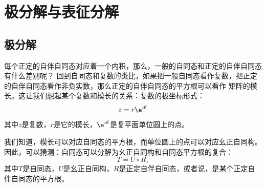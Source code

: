 \documentclass[12pt,UTF8,fontset=none]{ctexbook}
\begin{document}

\section{极分解与表征分解}

\subsection{极分解}
每个正定的自伴自同态对应着一个内积，那么，一般的自同态和正定的自伴自同态有什么差别呢？
回到自同态和复数的类比，如果把一般自同态看作复数，把正定的自伴自同态看作非负实数，那么正定的自伴自同态的平方根可以看作
矩阵的模长。这让我们想起某个复数和模长的关系：复数的极坐标形式：
$$ z = r \e^{\imath \theta} $$
其中$z$是复数，$r$是它的模长，$\e^{\imath \theta}$是复平面单位圆上的点。

我们知道，模长可以对应自同态的平方根，而单位圆上的点可以对应幺正自同构。
因此，可以猜测：自同态可以分解为幺正自同构和自同态平方根的复合：
$$ T = U \circ R,$$
其中$T$是自同态，$U$是幺正自同构，$R$是正定自伴自同态，或者说，是某个正定自伴自同态的平方根。
\end{document}
